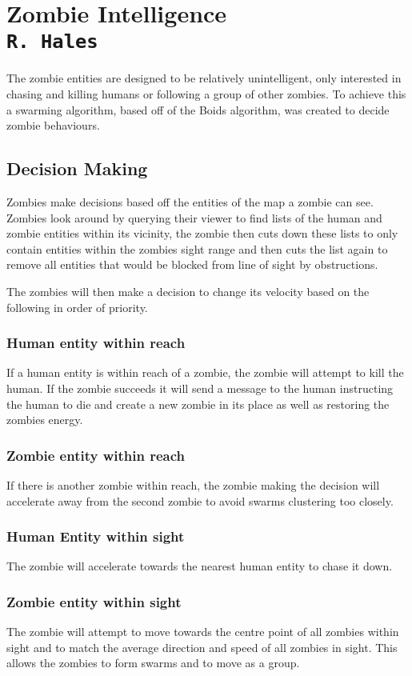 \pagestyle{empty}
\section{Zombie Intelligence\\{\small\tt{R.~Hales}}}
The zombie entities are designed to be relatively unintelligent, only interested in chasing and killing humans or following a group of other zombies. To achieve this a swarming algorithm, based off of the Boids algorithm,  was created to decide zombie behaviours.
\subsection{Decision Making}
Zombies make decisions based off the entities of the map a zombie can see. Zombies look around by querying their viewer to find lists of the human and zombie entities within its vicinity, the zombie then cuts down these lists to only contain entities within the zombies sight range and then cuts the list again to remove all entities that would be blocked from line of sight by obstructions.

The zombies will then make a decision to change its velocity based on the following in order of priority.
\subsubsection{Human entity within reach}
If a human entity is within reach of a zombie, the zombie will attempt to kill the human. If the zombie succeeds it will send a message to the human instructing the human to die and create a new zombie in its place as well as restoring the zombies energy.

\subsubsection{Zombie entity within reach}
If there is another zombie within reach, the zombie making the decision will accelerate away from the second zombie to avoid swarms clustering too closely.

\subsubsection{Human Entity within sight}
The zombie will accelerate towards the nearest human entity to chase it down.

\subsubsection{Zombie entity within sight}
The zombie will attempt to move towards the centre point of all zombies within sight and to match the average direction and speed of all zombies in sight. This allows the zombies to form swarms and to move as a group.

